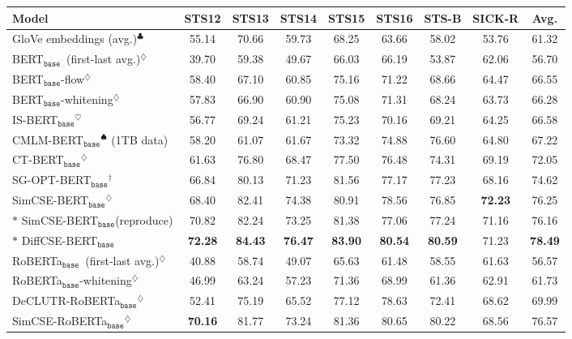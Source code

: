 \documentclass[11pt]{article}
\newcommand{\ba}{$_\texttt{base}$\xspace}
\newcommand\tf[1]{\textbf{#1}}
\begin{document}
\begin{table*}[th!]
    \begin{center}
    \centering
    \small
    \begin{tabular}{lcccccccc}
    \toprule
       \tf{Model} & \tf{STS12} & \tf{STS13} & \tf{STS14} & \tf{STS15} & \tf{STS16} & \tf{STS-B} & \tf{SICK-R} & \tf{Avg.} \\
    \midrule
        GloVe embeddings (avg.)$^\clubsuit$ & 55.14 & 70.66 & 59.73 & 68.25 & 63.66 & 58.02 & 53.76 & 61.32 \\
        BERT\ba~(first-last avg.)$^\diamondsuit$ & 39.70&	59.38&	49.67&	66.03&	66.19&	53.87&	62.06&	56.70\\
        BERT\ba-flow$^\diamondsuit$ & 58.40&	67.10&	60.85&	75.16&	71.22&	68.66&	64.47&	66.55 \\ 
        BERT\ba-whitening$^\diamondsuit$ & 57.83& 66.90 & 60.90 & 75.08& 71.31& 68.24& 63.73& 66.28\\ 
        IS-BERT\ba$^\heartsuit$ & 56.77 & 69.24 & 61.21 & 75.23 & 70.16 & 69.21 & 64.25 & 66.58 \\
        CMLM-BERT\ba$^\spadesuit$ {\scriptsize(1TB data)} & 58.20 & 61.07 & 61.67 & 73.32 & 74.88 & 76.60 & 64.80 & 67.22 \\
        CT-BERT\ba$^\diamondsuit$ & 61.63 & 76.80 & 68.47 & 77.50 & 76.48 & 74.31 & 69.19 &72.05 \\
        SG-OPT-BERT\ba$^\dagger$ & 66.84 & 80.13 & 71.23 & 81.56 & 77.17 & 77.23 & 68.16 & 74.62 \\
        SimCSE-BERT\ba$^\diamondsuit$ &  68.40 & 82.41  & 74.38 & 80.91 & 78.56 & 76.85 & \bf 72.23 & 76.25 \\
        $*$ SimCSE-BERT\ba {\scriptsize(reproduce)} & 70.82 & 82.24 & 73.25 & 81.38 & 77.06 & 77.24 & 71.16 & 76.16 \\
        $*$ DiffCSE-BERT\ba & \bf 72.28 & \bf 84.43 & \bf 76.47 & \bf 83.90 & \bf 80.54 & \bf 80.59 & 71.23 & \bf 78.49 \\
        \midrule
        RoBERTa\ba~(first-last avg.)$^\diamondsuit$ & 40.88&	58.74&	49.07&	65.63&	61.48&	58.55&	61.63&	56.57\\
        RoBERTa\ba-whitening$^\diamondsuit$ & 46.99& 63.24&	57.23&	71.36&	68.99&	61.36&	62.91& 61.73\\ 
        DeCLUTR-RoBERTa\ba$^\diamondsuit$ & 52.41 & 75.19& 65.52 & 77.12 & 78.63 & 72.41 &  68.62  & 69.99\\
        SimCSE-RoBERTa\ba$^\diamondsuit$ &  \bf 70.16  & 81.77 	& 73.24 	& 81.36 	& 80.65 	& 80.22 	&	68.56 &  76.57 \\

\end{tabular}
\end{center}
\end{table*}
\end{document}
